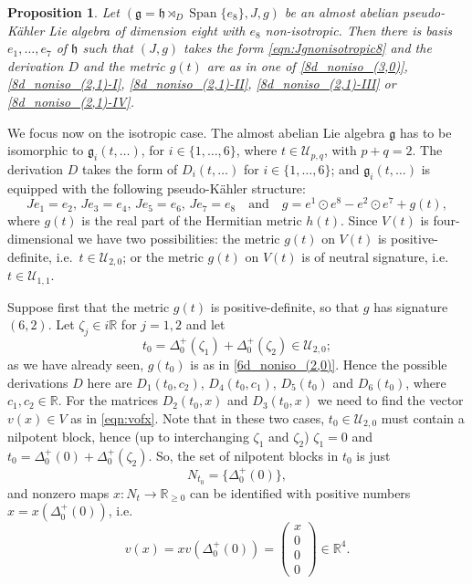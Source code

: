 \documentclass{article}
\newtheorem{proposition}[theorem]{Proposition}
\theoremstyle{definition}
\newcommand{\R}{\mathbb{R}}
\newcommand{\frg}{\mathfrak{g}}
\newcommand{\frh}{\mathfrak{h}}
\newcommand{\Span}[1]{\operatorname{Span}\{#1\}}
\newcommand{\lie}[1]{\mathfrak{#1}}
\newcommand{\g}{\lie g}
\begin{document}
\begin{proposition}
    Let $(\frg=\frh\rtimes_D{\Span{e_8}},J,g)$ be an almost abelian pseudo-Kähler Lie algebra of dimension eight with $e_8$ non-isotropic. Then there is basis $e_1,\dotsc, e_7$ of $\frh$ such that $(J,g)$ takes the form \eqref{eqn:Jgnonisotropic8} and the derivation $D$ and the metric $g(t)$ are as in one of \eqref{8d_noniso_(3,0)}, \eqref{8d_noniso_(2,1)-I}, \eqref{8d_noniso_(2,1)-II}, \eqref{8d_noniso_(2,1)-III} or \eqref{8d_noniso_(2,1)-IV}.
\end{proposition}

We focus now on the isotropic case. The almost abelian Lie algebra $\frg$ has to be isomorphic to $\g_i(t,\dots)$, for $i\in\{1,\ldots,6\}$, where $t\in\mathcal{U}_{p,q}$, with $p+q=2$. The derivation $D$ takes the form of $D_i(t,\dots)$ for $i\in\{1,\ldots,6\}$; and $\frg_i(t,\dots)$ is equipped with the following pseudo-Kähler structure: $$Je_1=e_2,\,Je_3=e_4,\,Je_5=e_6,\,Je_7=e_8\quad\text{and}\quad g=e^1\odot e^8-e^2\odot e^7+g(t),$$ where $g(t)$ is the real part of the Hermitian metric $h(t)$. Since $V(t)$ is four-dimensional we have two possibilities: the metric $g(t)$ on $V(t)$ is positive-definite, i.e.\ $t\in\mathcal{U}_{2,0}$; or the metric $g(t)$ on $V(t)$ is of neutral signature, i.e.\ $t\in\mathcal{U}_{1,1}$.\medskip

Suppose first that the metric $g(t)$ is positive-definite, so that $g$ has signature $(6,2)$. Let $\zeta_j\in i\R$ for $j=1,2$ and let $$t_0=\Delta_0^+(\zeta_1)+\Delta_0^+(\zeta_2)\in\mathcal{U}_{2,0};$$ as we have already seen, $g(t_0)$ is as in \eqref{6d_noniso_(2,0)}. Hence the possible derivations $D$ here are $D_1(t_0,c_2)$, $D_4(t_0,c_1)$, $D_5(t_0)$ and $D_6(t_0)$, where $c_1,c_2\in\R$. For the matrices $D_2(t_0,x)$ and $D_3(t_0,x)$ we need to find the vector $v(x)\in V$ as in \eqref{eqn:vofx}. Note that in these two cases, $t_0\in\mathcal{U}_{2,0}$ must contain a nilpotent block, hence (up to interchanging $\zeta_1$ and $\zeta_2$) $\zeta_1=0$ and $t_0=\Delta_0^+(0)+\Delta_0^+(\zeta_2)$. So, the set of nilpotent blocks in $t_0$ is just $$N_{t_0}=\{\Delta_0^+(0)\},$$ and nonzero maps $x\colon N_t\to \R_{\geq0}$ can be identified with positive numbers $x=x(\Delta_0^+(0))$, i.e.\ $$v(x)=x v(\Delta_0^+(0))=\begin{pmatrix}
    x\\
    0\\
    0\\
    0
\end{pmatrix}\in\R^4.$$
\end{document}
